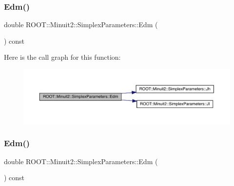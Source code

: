\subsubsection{\texorpdfstring{Edm()}{Edm()}\hspace{0.1cm}{\footnotesize\ttfamily [2/3]}}
{\footnotesize\ttfamily double R\+O\+O\+T\+::\+Minuit2\+::\+Simplex\+Parameters\+::\+Edm (\begin{DoxyParamCaption}{ }\end{DoxyParamCaption}) const\hspace{0.3cm}{\ttfamily [inline]}}

Here is the call graph for this function\+:
\nopagebreak
\begin{figure}[H]
\begin{center}
\leavevmode
\includegraphics[width=350pt]{d7/da2/classROOT_1_1Minuit2_1_1SimplexParameters_ad71f372dd3873cbf351dc8eddc3a9c9a_cgraph}
\end{center}
\end{figure}
\mbox{\label{classROOT_1_1Minuit2_1_1SimplexParameters_ad71f372dd3873cbf351dc8eddc3a9c9a}} 
\subsubsection{\texorpdfstring{Edm()}{Edm()}\hspace{0.1cm}{\footnotesize\ttfamily [3/3]}}
{\footnotesize\ttfamily double R\+O\+O\+T\+::\+Minuit2\+::\+Simplex\+Parameters\+::\+Edm (\begin{DoxyParamCaption}{ }\end{DoxyParamCaption}) const\hspace{0.3cm}{\ttfamily [inline]}}

